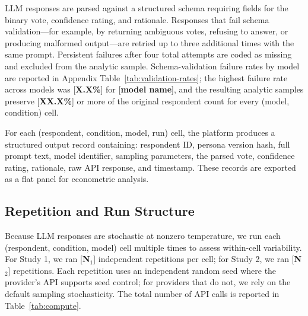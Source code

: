 \documentclass[12pt]{article}
\begin{document}
LLM responses are parsed against a structured schema requiring fields for
the binary vote, confidence rating, and rationale. Responses that fail
schema validation---for example, by returning ambiguous votes, refusing
to answer, or producing malformed output---are retried up to three
additional times with the same prompt. Persistent failures after four
total attempts are coded as missing and excluded from the analytic sample.
Schema-validation failure rates by model are reported in Appendix
Table~\ref{tab:validation-rates}; the highest failure rate across models
was [\textbf{X.X\%}] for [\textbf{model name}], and the resulting analytic
samples preserve [\textbf{XX.X\%}] or more of the original respondent
count for every (model, condition) cell.

For each (respondent, condition, model, run) cell, the platform produces
a structured output record containing: respondent ID, persona version
hash, full prompt text, model identifier, sampling parameters, the parsed
vote, confidence rating, rationale, raw API response, and timestamp.
These records are exported as a flat panel for econometric analysis.

\subsection{Repetition and Run Structure}\label{sec:methods-repetition}

Because LLM responses are stochastic at nonzero temperature, we run each
(respondent, condition, model) cell multiple times to assess within-cell
variability. For Study 1, we ran [\textbf{N$_1$}] independent repetitions
per cell; for Study 2, we ran [\textbf{N$_2$}] repetitions. Each
repetition uses an independent random seed where the provider's API
supports seed control; for providers that do not, we rely on the default
sampling stochasticity. The total number of API calls is reported in
Table~\ref{tab:compute}.
\end{document}
